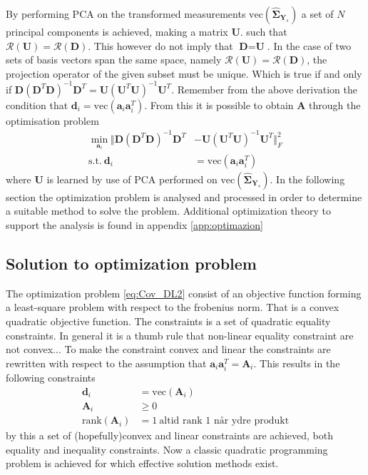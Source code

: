 By performing PCA on the transformed measurements $\text{vec}(\widehat{\boldsymbol{\Sigma}}_{\textbf{Y}_s})$ a set of $N$ principal components is achieved, making a matrix $\textbf{U}$. such that $\mathcal{R}(\textbf{U})=\mathcal{R}(\textbf{D})$. 
This however do not imply that $\textbf{D}=\textbf{U}$. 
In the case of two sets of basis vectors span the same space, namely $\mathcal{R}(\textbf{U})=\mathcal{R}(\textbf{D})$, the projection operator of the given subset must be unique. 
Which is true if and only if $\textbf{D}(\textbf{D}^T\textbf{D})^{-1}\textbf{D}^T=\textbf{U}(\textbf{U}^T\textbf{U})^{-1}\textbf{U}^T$. 
Remember from the above derivation the condition that $\textbf{d}_i = \text{vec}(\textbf{a}_i\textbf{a}_i^T)$. 
From this it is possible to obtain $\textbf{A}$ through the optimisation problem 
\begin{align}
\min_{\textbf{a}_i}\Vert  \textbf{D}(\textbf{D}^T\textbf{D})^{-1}\textbf{D}^T &- \textbf{U}(\textbf{U}^T\textbf{U})^{-1}\textbf{U}^T \Vert_{F}^{2} \nonumber \\
\text{s.t.} \ \textbf{d}_i&=\text{vec}(\textbf{a}_i\textbf{a}_i^T)\label{eq:Cov_DL2}
\end{align}      
where $\textbf{U}$ is learned by use of PCA performed on $\text{vec}(\widehat{\boldsymbol{\Sigma}}_{\textbf{Y}_s})$.
In the following section the optimization problem is analysed and processed in order to determine a suitable method to solve the problem. Additional optimization theory to support the analysis is found in appendix \ref{app:optimazion}  

\subsection{Solution to optimization problem}
The optimization problem \eqref{eq:Cov_DL2} consist of an objective function forming a least-square problem with respect to the frobenius norm.
That is a convex quadratic objective function.
The constraints is a set of quadratic equality constraints. In general it is a thumb rule that non-linear equality constraint are not convex...
To make the constraint convex and linear the constraints are rewritten with respect to the assumption that $\textbf{a}_i\textbf{a}_i^{T} = \textbf{A}_i$. This results in the following constraints 
\begin{align}
\textbf{d}_i &= \text{vec}(\textbf{A}_i) \\
\textbf{A}_i &\geq  0 \\
\text{rank}(\textbf{A}_i) &= 1 \ \text{altid rank 1 når ydre produkt}
\end{align}          
by this a set of (hopefully)convex and linear constraints are achieved, both equality and inequality constraints.
Now a classic quadratic programming problem is achieved      for which effective solution methods exist.   